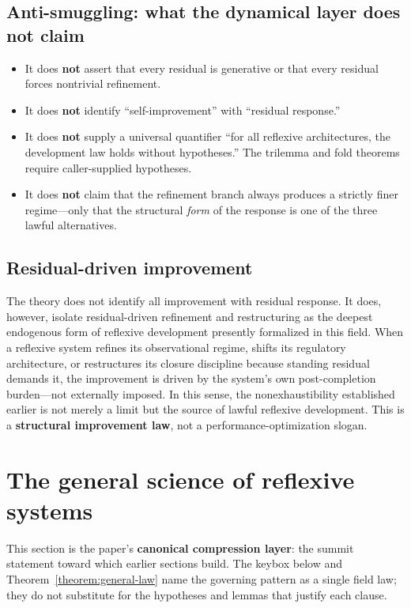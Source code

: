 \documentclass[11pt]{article}
\theoremstyle{plain}
\theoremstyle{definition}
\theoremstyle{remark}
\begin{document}
\subsection{Anti-smuggling: what the dynamical layer does not claim}

\begin{itemize}[leftmargin=1.5em]
\item It does \textbf{not} assert that every residual is generative or that every residual forces nontrivial refinement.
\item It does \textbf{not} identify ``self-improvement'' with ``residual response.''
\item It does \textbf{not} supply a universal quantifier ``for all reflexive architectures, the development law holds without hypotheses.'' The trilemma and fold theorems require caller-supplied hypotheses.
\item It does \textbf{not} claim that the refinement branch always produces a strictly finer regime---only that the structural \emph{form} of the response is one of the three lawful alternatives.
\end{itemize}

\subsection{Residual-driven improvement}

The theory does not identify all improvement with residual response. It does, however, isolate residual-driven refinement and restructuring as the deepest endogenous form of reflexive development presently formalized in this field. When a reflexive system refines its observational regime, shifts its regulatory architecture, or restructures its closure discipline because standing residual demands it, the improvement is driven by the system's own post-completion burden---not externally imposed. In this sense, the nonexhaustibility established earlier is not merely a limit but the source of lawful reflexive development.
This is a \textbf{structural improvement law}, not a performance-optimization slogan.

\section{The general science of reflexive systems}\label{sec:general-science}

This section is the paper's \textbf{canonical compression layer}: the summit statement toward which earlier sections build. The keybox below and Theorem~\ref{theorem:general-law} name the governing pattern as a single field law; they do not substitute for the hypotheses and lemmas that justify each clause.
\end{document}
